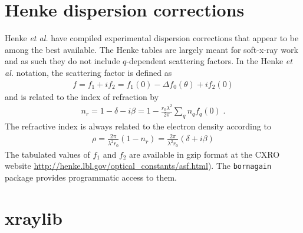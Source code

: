 \documentclass[11pt]{article}
\begin{document}
\section{Henke dispersion corrections}
Henke {\itshape et al.}\cite{henkeXRayInteractionsPhotoabsorption1993} have compiled experimental dispersion corrections that appear to be among the best available.  The Henke tables are largely meant for soft-x-ray work and as such they do not include $q$-dependent scattering factors.
In the Henke {\itshape et al.}\cite{henkeXRayInteractionsPhotoabsorption1993} notation, the scattering factor is defined as
\begin{align}
f=f_1+if_2=f_1(0)-\Delta f_0(\theta)+if_2(0)
\end{align}
and is related to the index of refraction by
\begin{align}
n_r = 1 - \delta -i\beta = 1 -\frac{r_0\lambda^2}{2\pi}\sum_q n_qf_q(0) \; .
\end{align}
The refractive index is always related to the electron density according to
\begin{align}
\rho =  \frac{2\pi}{\lambda^2 r_0 } \left( 1 - n_r \right) = \frac{2\pi}{\lambda^2 r_0 } \left( \delta + i \beta \right) 
\end{align}
The tabulated values of $f_1$ and $f_2$ are available in gzip format at the CXRO website \url{http://henke.lbl.gov/optical_constants/asf.html}).  The \texttt{bornagain} package provides programmatic access to them.


\section{xraylib}
\end{document}
